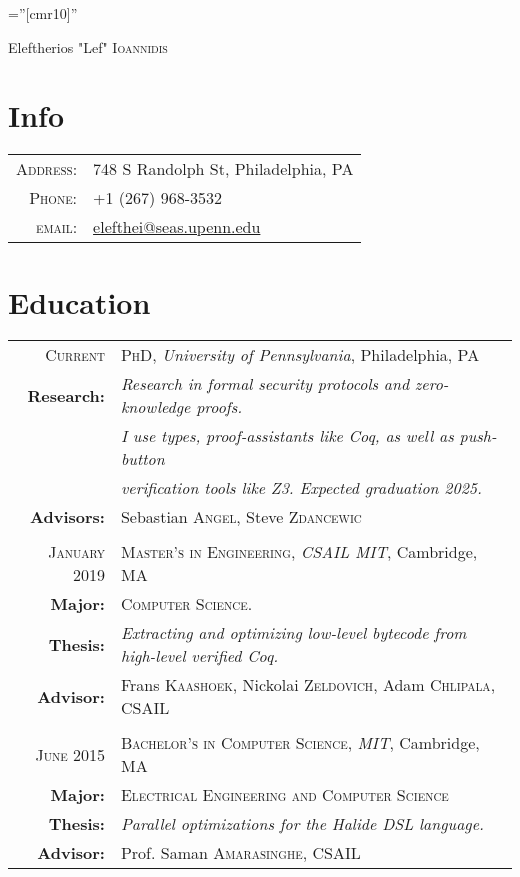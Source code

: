 \documentclass[lettersize,11pt]{article}
\begin{document}
\pagestyle{empty} %
\font\fb=''[cmr10]'' %

\par{\centering
		{\Huge Eleftherios "Lef" \textsc{Ioannidis}
	}
	\bigskip\par}

\section{Info}

\begin{tabular}{rl}
    \textsc{Address:}   & 748 S Randolph St, Philadelphia, PA \\
    \textsc{Phone:}     & +1 (267) 968-3532 \\
    \textsc{email:}     & \href{mailto:elefthei@seas.upenn.edu}{elefthei@seas.upenn.edu}
\end{tabular}

\section{Education}
\begin{tabular}{rl}
\textsc{Current} & \textsc{PhD}, \emph{University of Pennsylvania}, Philadelphia, PA\\
\textbf{Research:} & \emph{Research in formal security protocols and zero-knowledge proofs.}\\
& \emph{I use types, proof-assistants like Coq, as well as push-button} \\
& \emph{verification tools like Z3. Expected graduation 2025.} \\
\textbf{Advisors:} & Sebastian \textsc{Angel}, Steve \textsc{Zdancewic}\\
& \\
\textsc{January} 2019 & \textsc{Master's in Engineering}, \emph{CSAIL MIT}, Cambridge, MA\\
\textbf{Major:} & \textsc{Computer Science.}\\
\textbf{Thesis:} & \emph{Extracting and optimizing low-level bytecode from high-level verified Coq.}\\
\textbf{Advisor:} & Frans \textsc{Kaashoek}, Nickolai \textsc{Zeldovich}, Adam \textsc{Chlipala},  CSAIL\\
 & \\
\textsc{June} 2015 & \textsc{Bachelor's in Computer Science}, \emph{MIT}, Cambridge, MA\\
\textbf{Major:} & \textsc{Electrical Engineering and Computer Science}\\
\textbf{Thesis:} & \emph{Parallel optimizations for the Halide DSL language.}\\
\textbf{Advisor:} & Prof. Saman \textsc{Amarasinghe}, CSAIL\\
\end{tabular}
\end{document}
